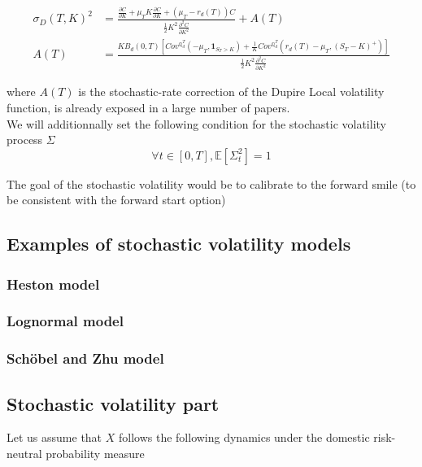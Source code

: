 \documentclass{article}
\begin{document}
\begin{equation}
\begin{aligned}
	\sigma_D(T,K)^2 &= \frac{\frac{\partial C}{\partial K} + \mu_T K \frac{\partial C}{\partial K} + \left(\mu_T - r_d(T)\right) C}{\frac{1}{2}K^2 \frac{\partial^2 C}{\partial K^2}} + A(T)\\
	A(T) &= \frac{KB_d(0,T) \left[Cov^{\mathbb{Q}_d^T}\left(-\mu_T, \textbf{1}_{S_T>K}\right) + \frac{1}{K} Cov^{\mathbb{Q}_d^T}\left(r_d(T)-\mu_T, \left(S_T-K\right)^+\right)\right]}{\frac{1}{2}K^2 \frac{\partial^2 C}{\partial K^2}}
\end{aligned}
\end{equation}

\noindent where $A(T)$ is the stochastic-rate correction of the Dupire Local volatility function, is already exposed in a large number of papers.\\

\noindent We will additionnally set the following condition for the stochastic volatility process $\Sigma$ 
\begin{equation}
	\forall t \in [0,T], \mathbb{E}\left[\Sigma_t^2 \right] = 1
\end{equation}

\noindent The goal of the stochastic volatility would be to calibrate to the forward smile (to be consistent with the forward start option)

\subsection{Examples of stochastic volatility models}
\subsubsection{Heston model}
\subsubsection{Lognormal model}
\subsubsection{Schöbel and Zhu model}

\subsection{Stochastic volatility part}
Let us assume that $X$ follows the following dynamics under the domestic risk-neutral probability measure
\end{document}
